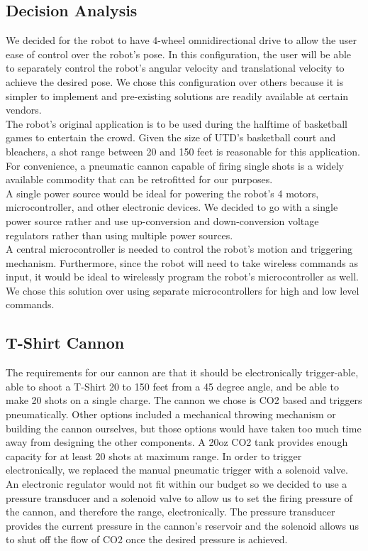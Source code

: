 \documentclass[letterpaper,12pt]{article}
\begin{document}
\subsection{Decision Analysis}
\noindent We decided for the robot to have 4-wheel omnidirectional drive to allow the user ease of control over the robot's pose. In this configuration, the user will be able to separately control the robot's angular velocity and translational velocity to achieve the desired pose. We chose this configuration over others because it is simpler to implement and pre-existing solutions are readily available at certain vendors. \\

\noindent The robot's original application is to be used during the halftime of basketball games to entertain the crowd. Given the size of UTD's basketball court and bleachers, a shot range between 20 and 150 feet is reasonable for this application. For convenience, a pneumatic cannon capable of firing single shots is a widely available commodity that can be retrofitted for our purposes. \\

\noindent A single power source would be ideal for powering the robot's 4 motors, microcontroller, and other electronic devices. We decided to go with a single power source rather and use up-conversion and down-conversion voltage regulators rather than using multiple power sources. \\ 

\noindent A central microcontroller is needed to control the robot's motion and triggering mechanism. Furthermore, since the robot will need to take wireless commands as input, it would be ideal to wirelessly program the robot's microcontroller as well. We chose this solution over using separate microcontrollers for high and low level commands. \\

\subsection{T-Shirt Cannon}
The requirements for our cannon are that it should be electronically trigger-able, able to shoot a T-Shirt 20 to 150 feet from a 45 degree angle, and be able to make 20 shots on a single charge. The cannon we chose is CO2 based and triggers pneumatically. Other options included a mechanical throwing mechanism or building the cannon ourselves, but those options would have taken too much time away from designing the other components. A 20oz CO2 tank provides enough capacity for at least 20 shots at maximum range. In order to trigger electronically, we replaced the manual pneumatic trigger with a solenoid valve. An electronic regulator would not fit within our budget so we decided to use a pressure transducer and a solenoid valve to allow us to set the firing pressure of the cannon, and therefore the range, electronically. The pressure transducer provides the current pressure in the cannon’s reservoir and the solenoid allows us to shut off the flow of CO2 once the desired pressure is achieved.\\ 
\end{document}
